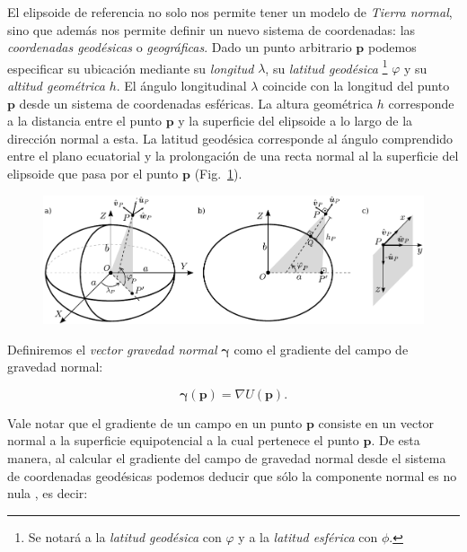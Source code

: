 El elipsoide de referencia no solo nos permite tener un modelo de \emph{Tierra
normal}, sino que además nos permite definir un nuevo sistema de coordenadas:
las \emph{coordenadas geodésicas} o \emph{geográficas}.
Dado un punto arbitrario $\mathbf{p}$ podemos especificar su ubicación mediante
su \emph{longitud} $\lambda$, su
\emph{latitud geodésica} \footnote{
    Se notará a la \emph{latitud geodésica} con $\varphi$ y a la \emph{latitud
    esférica} con $\phi$.
}
$\varphi$ y su \emph{altitud geométrica} $h$.
El ángulo longitudinal $\lambda$ coincide con la longitud del punto
$\mathbf{p}$ desde un sistema de coordenadas esféricas.
La altura geométrica $h$ corresponde a la distancia entre el punto $\mathbf{p}$
y la superficie del elipsoide a lo largo de la dirección normal a esta.
La latitud geodésica corresponde al ángulo comprendido entre el plano
ecuatorial y la prolongación de una recta normal al la superficie del elipsoide
que pasa por el punto $\mathbf{p}$ (Fig.~\ref{fig:coordenadas-geodesicas}).

\begin{figure}
    \centering
    \includegraphics[width=\linewidth]{figs/cartesian-geodetic-systems.pdf}
    \caption{\citep{oliveira2021}}
    \label{fig:coordenadas-geodesicas}
\end{figure}

Definiremos el \emph{vector gravedad normal} $\boldsymbol\gamma$ como el
gradiente del campo de gravedad normal:

\begin{equation}
    \boldsymbol\gamma(\mathbf{p}) = \nabla U(\mathbf{p}).
\end{equation}

Vale notar que el gradiente de un campo en un punto $\mathbf{p}$ consiste en un
vector normal a la superficie equipotencial a la cual pertenece el punto
$\mathbf{p}$.
De esta manera, al calcular el gradiente del campo de gravedad normal desde el
sistema de coordenadas geodésicas podemos deducir que sólo la componente
normal es no nula \citep[][p.~68]{heiskanen1967}, es decir:

